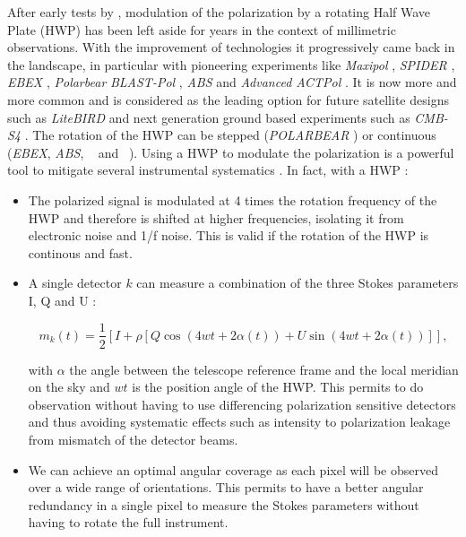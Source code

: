 After early tests by \citep{1984ApJ...284L..51H}, modulation of the polarization by a rotating Half Wave Plate (HWP) has been left aside for  years in the context of millimetric observations. With the improvement of technologies it progressively came back in the landscape, in particular with pioneering experiments like \emph{Maxipol} \citep{2007ApJ...665...42J}, \emph{SPIDER} \citep{2008SPIE.7010E..2PC}, \emph{EBEX} \citep{2010SPIE.7741E..1CR}, \emph{Polarbear} \citep{2012SPIE.8452E..1CK} \emph{BLAST-Pol} \citep{2014MNRAS.437.2772M}, \emph{ABS} \citep{2014RScI...85c9901K} and \emph{Advanced ACTPol} \citep{2016JLTP..184..772H}. It is now more and more common and is considered as the leading option for future satellite designs such as \emph{LiteBIRD} \citep{2014JLTP..176..733M} and next generation ground based experiments such as \emph{CMB-S4} \citep{2016arXiv161002743A}. The rotation of the HWP can be stepped (\emph{POLARBEAR} \citep{2014ApJ...794..171P}) or continuous  (\emph{EBEX}, \emph{ABS}, \nika\ \citep{2017A&A...599A..34R} and \nikad\  \citep{2015fers.confE..16R}).
Using a HWP to modulate the polarization is a powerful tool to mitigate several instrumental systematics \citep{2009MNRAS.397..634B}. In fact, with a HWP :

\begin{itemize}
\item The polarized signal is modulated at 4 times the rotation frequency of the HWP and therefore is shifted at higher frequencies, isolating it from electronic noise and 1/f noise. This is valid if the rotation of the HWP is continous and fast.

\item A single detector $k$ can measure a combination of the three Stokes parameters I, Q and U :

\begin{equation}
\label{eq:polar_measure}
m_{k}(t) = \frac{1}{2} [I + \rho [Q \cos (4wt + 2 \alpha(t)) + U \sin (4wt + 2 \alpha(t))]],
\end{equation}

with $\alpha$ the angle between the telescope reference frame and the local meridian on the sky and $wt$ is the position angle of the HWP.
This permits to do observation without having to use differencing polarization sensitive detectors and thus avoiding systematic effects such as intensity to polarization leakage from mismatch of the detector beams.

\item We can achieve an optimal angular coverage as each pixel will be observed over a wide range of orientations. This permits to have a better angular redundancy in a single pixel to measure the Stokes parameters without having to rotate the full instrument.
\end{itemize}

